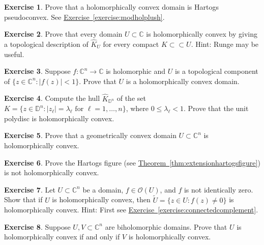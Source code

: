 \documentclass[12pt,openany]{book}
\newcommand{\sabs}[1]{\lvert {#1} \rvert}
\newcommand{\C}{{\mathbb{C}}}
\newcommand{\D}{{\mathbb{D}}}
\newcommand{\sO}{{\mathscr{O}}}
\theoremstyle{plain}
\theoremstyle{remark}
\theoremstyle{definition}
\newenvironment{exbox}{%
    \def\FrameCommand{\vrule width 1pt \relax\hspace{10pt}}%
    \MakeFramed{\advance\hsize-\width\FrameRestore}%
}{%
    \endMakeFramed
}
\theoremstyle{exercise}
\newtheorem{exercise}{Exercise}[section]
\theoremstyle{example}
\newcommand{\exerciseref}[1]{\hyperref[#1]{Exercise~\ref*{#1}}}
\newcommand{\thmref}[1]{\hyperref[#1]{Theorem~\ref*{#1}}}
\begin{document}
\begin{exbox}
\begin{exercise}
Prove that a holomorphically convex domain is Hartogs pseudoconvex.
See \exerciseref{exercise:modholplush}.
\end{exercise}

\begin{exercise}
Prove that every domain $U \subset \C$ is holomorphically convex by
giving a topological description of $\widehat{K}_U$ for every
compact $K \subset \subset U$.  Hint: Runge may be useful.
\end{exercise}

\begin{exercise}
Suppose $f \colon \C^n \to \C$ is holomorphic and $U$ is a topological
component of $\bigl\{ z \in \C^n : \sabs{f(z)} < 1 \bigr\}$.  Prove
that $U$ is a holomorphically convex domain.
\end{exercise}

\begin{exercise}
Compute the hull
$\widehat{K}_{\D^n}$ of the set $K = \bigl\{ z \in \D^n : \sabs{z_\ell} =
\lambda_\ell \text{ for } \ell=1,\ldots,n \bigr\}$, where $0 \leq \lambda_\ell < 1$.
Prove that the unit polydisc is holomorphically convex.
\end{exercise}

\begin{exercise}
Prove that a geometrically convex domain $U \subset \C^n$
is holomorphically convex.
\end{exercise}

\begin{exercise}
Prove the Hartogs figure (see \thmref{thm:extensionhartogsfigure})
is not holomorphically convex.
\end{exercise}

\begin{exercise}
Let $U \subset \C^n$ be a domain, $f \in \sO(U)$, and $f$ is not identically
zero.  Show that if
$U$ is holomorphically convex, then
$\widetilde{U} = \bigl\{ z \in U : f(z) \not= 0 \bigr\}$
is holomorphically convex.
Hint: First see \exerciseref{exercise:connectedcomplement}.
\end{exercise}

\begin{exercise} \label{exercise:biholholconvex}
Suppose $U,V \subset \C^n$ are biholomorphic domains.
Prove that $U$ is holomorphically convex if and only if $V$ is
holomorphically convex.
\end{exercise}


\end{exbox}
\end{document}
